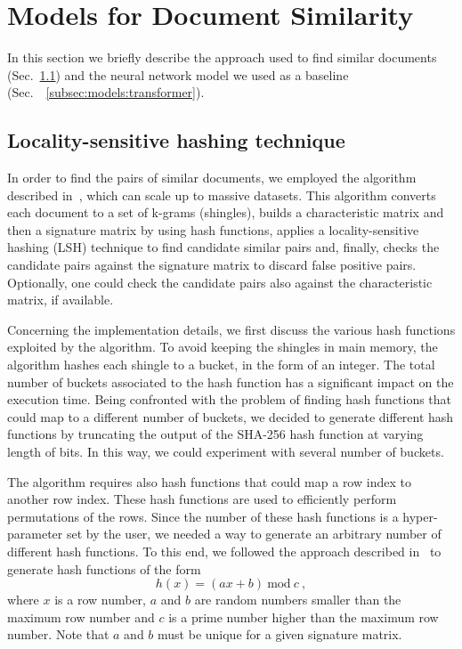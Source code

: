 \documentclass[runningheads]{llncs}
\begin{document}
\section{Models for Document Similarity}
\label{sec:models}

In this section we briefly describe the approach used to find similar documents (Sec.~\ref{subsec:models:lsh}) and the neural network model we used as a baseline (Sec.~~\ref{subsec:models:transformer}).

\subsection{Locality-sensitive hashing technique}
\label{subsec:models:lsh}

In order to find the pairs of similar documents, we employed the algorithm described in~\cite{leskovec_2020}, which can scale up to massive datasets. This algorithm converts each document to a set of k-grams (shingles), builds a characteristic matrix and then a signature matrix by using hash functions, applies a locality-sensitive hashing (LSH) technique to find candidate similar pairs and, finally, checks the candidate pairs against the signature matrix to discard false positive pairs. Optionally, one could check the candidate pairs also against the characteristic matrix, if available.

Concerning the implementation details, we first discuss the various hash functions exploited by the algorithm. To avoid keeping the shingles in main memory, the algorithm hashes each shingle to a bucket, in the form of an integer. The total number of buckets associated to the hash function has a significant impact on the execution time. Being confronted with the problem of finding hash functions that could map to a different number of buckets, we decided to generate different hash functions by truncating the output of the SHA-256 hash function at varying length of bits. In this way, we could experiment with several number of buckets.

The algorithm requires also hash functions that could map a row index to another row index. These hash functions are used to efficiently perform permutations of the rows. Since the number of these hash functions is a hyper-parameter set by the user, we needed a way to generate an arbitrary number of different hash functions. To this end, we followed the approach described in~\cite{liu_2015} to generate hash functions of the form
\[
  h(x) = (ax + b)~\text{mod}~c~,  
\]
where $x$ is a row number, $a$ and $b$ are random numbers smaller than the maximum row number and $c$ is a prime number higher than the maximum row number. Note that $a$ and $b$ must be unique for a given signature matrix.
\end{document}
